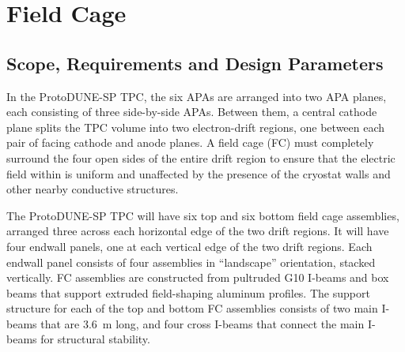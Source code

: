 



\section{Field Cage}
\label{detcompsec-fc}
\subsection{Scope, Requirements and Design Parameters}

In the ProtoDUNE-SP TPC, 
the six APAs are arranged into two APA planes, each consisting of three side-by-side APAs. Between them,  
a central cathode plane splits the TPC volume into two
electron-drift regions, one between
each pair of facing cathode and anode planes. %
A field cage (FC) must completely surround the four
open sides of the entire drift %
region %
to ensure that the %
 electric field within is uniform and unaffected by the presence
of the cryostat walls and other nearby conductive structures.


The ProtoDUNE-SP TPC will have six top and six bottom field cage assemblies, arranged three across each horizontal edge of the two drift regions. It will have 
four endwall panels, one at each vertical edge of the two drift regions.
Each endwall panel consists of four assemblies in ``landscape'' orientation, stacked vertically.
FC assemblies are constructed from pultruded G10 I-beams and box beams that support extruded field-shaping aluminum profiles. The support structure for each of the top and bottom FC assemblies consists of two main I-beams that are 3.6~m long, and four cross I-beams  that connect the main I-beams for structural stability.


